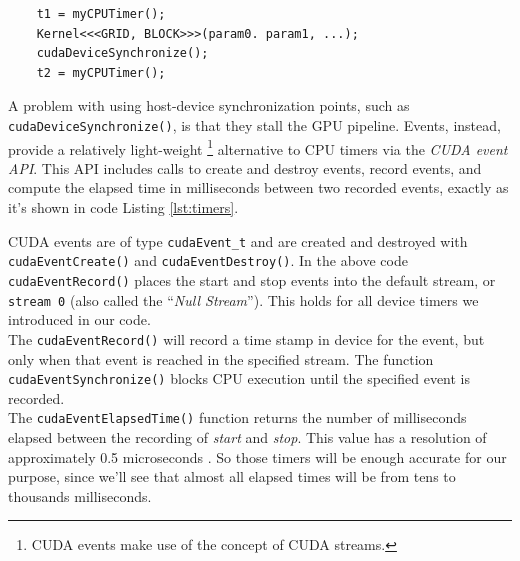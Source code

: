 \begin{lstlisting}
	t1 = myCPUTimer();
	Kernel<<<GRID, BLOCK>>>(param0. param1, ...);
	cudaDeviceSynchronize();
	t2 = myCPUTimer();
\end{lstlisting}
A problem with using host-device synchronization points, such as \texttt{cudaDeviceSynchronize()}, is that they stall the GPU pipeline.
Events, instead, provide a relatively light-weight \footnote{CUDA events make use of the concept of CUDA streams.} alternative to CPU timers via the \textit{CUDA event API}. This API includes calls to create and destroy events, record events, and compute the elapsed time in milliseconds between two recorded events, exactly as it's shown in code Listing \ref{lst:timers}.
 
CUDA events are of type \texttt{cudaEvent\_t} and are created and destroyed with \texttt{cudaEventCreate()} and \texttt{cudaEventDestroy()}. In the above code \texttt{cudaEventRecord()} places the start and stop events into the default stream, or \texttt{stream 0} (also called the “\textit{Null Stream}”). This holds for all device timers we introduced in our code.\\
The \texttt{cudaEventRecord()} will record a time stamp in device for the event, but only when that event is reached in the specified stream. The function \texttt{cudaEventSynchronize()} blocks CPU execution until the specified event is recorded.\\
The \texttt{cudaEventElapsedTime()} function returns the number of milliseconds elapsed between the recording of \textit{start} and \textit{stop}. This value has a resolution of approximately 0.5 microseconds \cite{devblogevents}. So those timers will be enough accurate for our purpose, since we'll see that almost all elapsed times will be from tens to thousands milliseconds.

